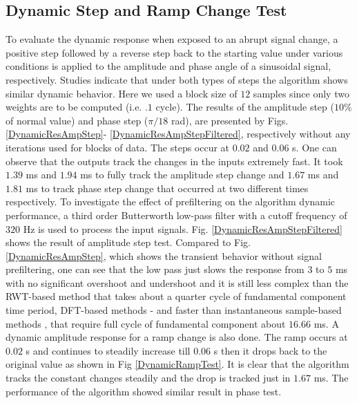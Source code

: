 \documentclass{UCF_ETD}
\begin{document}
\subsection{Dynamic Step and Ramp Change Test}
To evaluate the dynamic response when exposed to an abrupt signal change, a positive step followed by a reverse step back to the starting value under various conditions is applied to the amplitude and phase angle of a sinusoidal signal, respectively. Studies indicate that under both types of steps the algorithm shows similar dynamic behavior. Here we used a block size of $12$ samples since only two weights are to be computed (i.e. $.1$ cycle). The results of the amplitude step ($10\%$ of normal value) and phase step ($\pi/18$ rad), are presented by Figs. \ref{DynamicResAmpStep}- \ref{DynamicResAmpStepFiltered}, respectively without any iterations used for blocks of data. The steps occur at $0.02$ and $0.06$ s. One can observe that the outputs track the changes in the inputs extremely fast. It took $1.39$ ms and $1.94$ ms to fully track the amplitude step change and $1.67$ ms and $1.81$ ms to track phase step change that occurred at two different times respectively. To investigate the effect of prefiltering on the algorithm dynamic performance, a third order Butterworth low-pass filter with a cutoff frequency of $320$ Hz is used to process the input signals. Fig. \ref{DynamicResAmpStepFiltered} shows the result of amplitude step test. Compared to Fig. \ref{DynamicResAmpStep}, which shows the transient behavior without signal prefiltering, one can see that the low pass just slows the response from $3$ to $5$ ms with no significant overshoot and undershoot and it is still less complex than the RWT-based method \cite{Ren2011} that takes about a quarter cycle of fundamental component time period, DFT-based methods \cite{Benmouyal1989} -\cite{Sidhu1998} and faster than instantaneous sample-based methods \cite{Kusljevic2010}, \cite{Lopez2008} that require full cycle of fundamental component about $16.66$ ms. A dynamic amplitude response for a ramp change is also done. The ramp occurs at $0.02$ s and continues to steadily increase till $0.06$ s then it drops back to the original value as shown in Fig \ref{DynamicRampTest}. It is clear that the algorithm tracks the constant changes steadily and the drop is tracked just in $1.67$ ms. The performance of the algorithm showed similar result in phase test.
\end{document}
